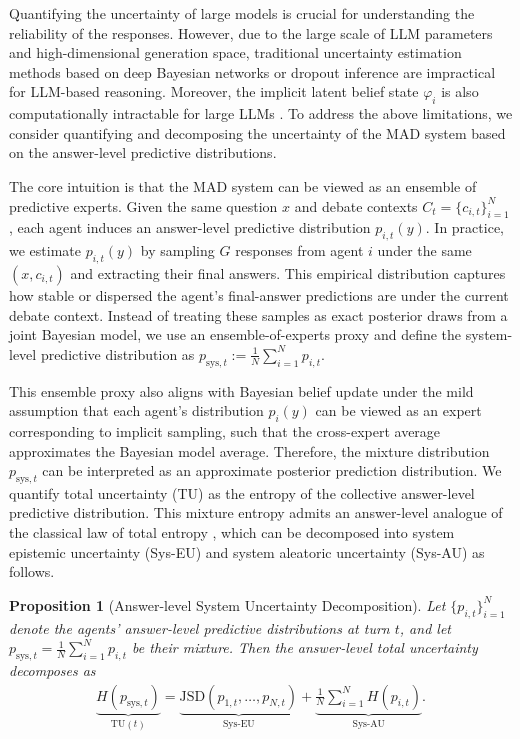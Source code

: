 \documentclass{article}
\theoremstyle{plain}
\newtheorem{proposition}[theorem]{Proposition}
\theoremstyle{definition}
\theoremstyle{remark}
\begin{document}
Quantifying the uncertainty of large models is crucial for understanding the reliability of the responses. However, due to the large scale of LLM parameters and high-dimensional generation space, traditional uncertainty estimation methods based on deep Bayesian networks or dropout inference \cite{lakshminarayanan2017simple, li2017dropout} are impractical for LLM-based reasoning. Moreover, the implicit latent belief state $\varphi_{i}$ is also computationally intractable for large LLMs \cite{abbasi2024believe,jayasekera2025variational}. To address the above limitations, we consider quantifying and decomposing the uncertainty of the MAD system based on the answer-level predictive distributions. 



The core intuition is that the MAD system can be viewed as an ensemble of predictive experts. Given the same question $x$ and debate contexts $C_t=\{c_{i,t}\}_{i=1}^N$, each agent induces an answer-level predictive distribution $p_{i,t}(y)$. In practice, we estimate $p_{i,t}(y)$ by sampling $G$ responses from agent $i$ under the same $(x,c_{i,t})$ and extracting their final answers. This empirical distribution captures how stable or dispersed the agent's final-answer predictions are under the current debate context. Instead of treating these samples as exact posterior draws from a joint Bayesian model, we use an ensemble-of-experts proxy and define the system-level predictive distribution as $p_{\mathrm{sys},t}:=\frac{1}{N}\sum_{i=1}^N p_{i,t}$.

This ensemble proxy also aligns with Bayesian belief update under the mild assumption that each agent's distribution $p_i(y)$ can be viewed as an expert corresponding to implicit sampling, such that the cross-expert average approximates the Bayesian model average. Therefore, the mixture distribution $p_{\mathrm{sys},t}$ can be interpreted as an approximate posterior prediction distribution. We quantify total uncertainty (TU) as the entropy of the collective answer-level predictive distribution. This mixture entropy admits an answer-level analogue of the classical law of total entropy \cite{lakshminarayanan2017simple}, which can be decomposed into system epistemic uncertainty (Sys-EU) and system aleatoric uncertainty (Sys-AU) as follows.


\begin{proposition}[Answer-level System Uncertainty Decomposition]\label{prop:sys_decomp}
Let $\{p_{i,t}\}_{i=1}^N$ denote the agents' answer-level predictive distributions at turn $t$, and let
$p_{\mathrm{sys},t}=\frac{1}{N}\sum_{i=1}^N p_{i,t}$ be their mixture. Then the answer-level total uncertainty decomposes as
\begin{align}
\underbrace{H(p_{\mathrm{sys},t})}_{\mathrm{TU}(t)}= 
\underbrace{\mathrm{JSD}(p_{1,t},\ldots,p_{N,t})}_{\mathrm{Sys\mbox{-}EU}}
+
\underbrace{\frac{1}{N}\sum_{i=1}^N H(p_{i,t})}_{\mathrm{Sys\mbox{-}AU}}.
\label{eq:sys_decomp}
\end{align}
\end{proposition}
\end{document}
